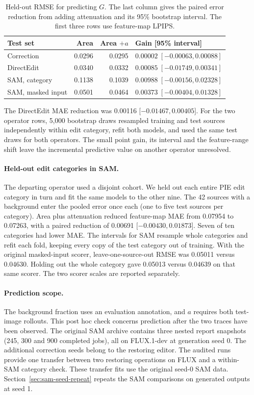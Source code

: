 \begin{table}[t]\centering
\caption{Held-out RMSE for predicting $G$. The last column gives the paired error reduction from adding attenuation and its 95\% bootstrap interval. The first three rows use feature-map LPIPS.}
\label{tab:v21-transfer}
{\footnotesize\setlength{\tabcolsep}{1.5pt}
\begin{tabular*}{\columnwidth}{@{\extracolsep{\fill}}lrrl@{}}\toprule
Test set & Area & Area $+a$ & Gain [95\% interval]\\\midrule
Correction & 0.0296 & 0.0295 & $0.00002\;[-0.00063,0.00088]$\\
DirectEdit & 0.0340 & 0.0332 & $0.00085\;[-0.01749,0.00341]$\\
SAM, category & 0.1138 & 0.1039 & $0.00988\;[-0.00156,0.02328]$\\
SAM, masked input & 0.0501 & 0.0464 & $0.00373\;[-0.00404,0.01328]$\\\bottomrule
\end{tabular*}}
\end{table}
The DirectEdit MAE reduction was 0.00116 [$-0.01467,0.00405$]. For the two operator rows, 5,000 bootstrap draws resampled training and test sources independently within edit category, refit both models, and used the same test draws for both operators. The small point gain, its interval and the feature-range shift leave the incremental predictive value on another operator unresolved.

\paragraph{Held-out edit categories in SAM.}
The departing operator used a disjoint cohort. We held out each entire PIE edit category in turn and fit the same models to the other nine. The 42 sources with a background enter the pooled error once each (one to five test sources per category). Area plus attenuation reduced feature-map MAE from 0.07954 to 0.07263, with a paired reduction of 0.00691 [$-0.00430,0.01873$]. Seven of ten categories had lower MAE. The intervals for SAM resample whole categories and refit each fold, keeping every copy of the test category out of training. With the original masked-input scorer, leave-one-source-out RMSE was 0.05011 versus 0.04630. Holding out the whole category gave 0.05013 versus 0.04639 on that same scorer. The two scorer scales are reported separately.

\paragraph{Prediction scope.}
The background fraction uses an evaluation annotation, and $a$ requires both test-image rollouts. This post hoc check concerns prediction after the two traces have been observed. The original SAM archive contains three nested report snapshots (245, 300 and 900 completed jobs), all on FLUX.1-dev at generation seed 0. The additional correction seeds belong to the restoring editor. The audited runs provide one transfer between two restoring operations on FLUX and a within-SAM category check. These transfer fits use the original seed-0 SAM data. Section~\ref{sec:sam-seed-repeat} repeats the SAM comparisons on generated outputs at seed 1.
